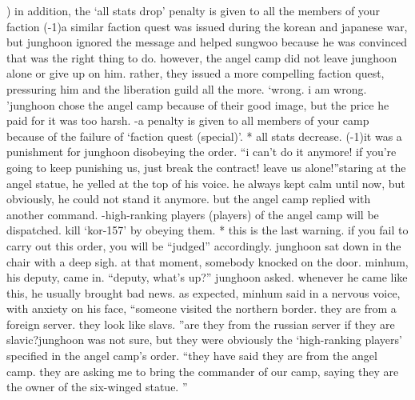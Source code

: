 ) in addition, the ‘all stats drop’ penalty is given to all the members of your faction (-1)a similar faction quest was issued during the korean and japanese war, but junghoon ignored the message and helped sungwoo because he was convinced that was the right thing to do.
however, the angel camp did not leave junghoon alone or give up on him.
 rather, they issued a more compelling faction quest, pressuring him and the liberation guild all the more.
‘wrong.
 i am wrong.
’junghoon chose the angel camp because of their good image, but the price he paid for it was too harsh.
-a penalty is given to all members of your camp because of the failure of ‘faction quest (special)’.
* all stats decrease.
 (-1)it was a punishment for junghoon disobeying the order.
“i can’t do it anymore! if you’re going to keep punishing us, just break the contract! leave us alone!”staring at the angel statue, he yelled at the top of his voice.
he always kept calm until now, but obviously, he could not stand it anymore.
but the angel camp replied with another command.
-high-ranking players (players) of the angel camp will be dispatched.
 kill ‘kor-157’ by obeying them.
* this is the last warning.
 if you fail to carry out this order, you will be “judged” accordingly.
junghoon sat down in the chair with a deep sigh.
at that moment, somebody knocked on the door.
 minhum, his deputy, came in.
“deputy, what’s up?” junghoon asked.
whenever he came like this, he usually brought bad news.
as expected, minhum said in a nervous voice, with anxiety on his face, “someone visited the northern border.
 they are from a foreign server.
 they look like slavs.
”are they from the russian server if they are slavic?junghoon was not sure, but they were obviously the ‘high-ranking players’ specified in the angel camp’s order.
“they have said they are from the angel camp.
 they are asking me to bring the commander of our camp, saying they are the owner of the six-winged statue.
”


